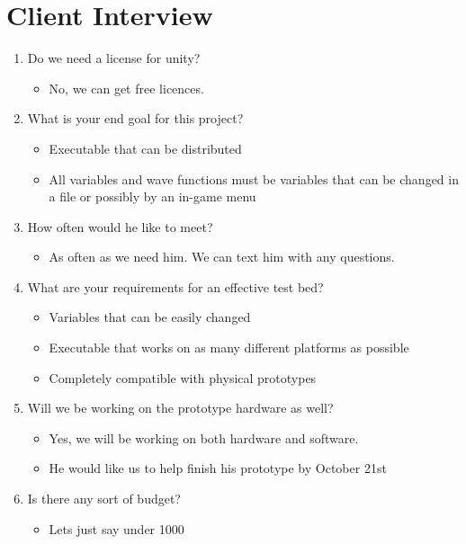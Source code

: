 \documentclass{scrreprt}
\begin{document}
\section{Client Interview}
\begin{enumerate}
\item Do we need a license for unity?
\begin{itemize}
  \item No, we can get free licences.
\end{itemize}
   
\item What is your end goal for this project?
\begin{itemize}
  \item Executable that can be distributed
  \item All variables and wave functions must be variables that can be changed in a file or possibly by an in-game menu
\end{itemize}

\item How often would he like to meet?
\begin{itemize}
  \item As often as we need him. We can text him with any questions.
\end{itemize}
  
\item What are your requirements for an effective test bed?
\begin{itemize}
  \item Variables that can be easily changed
  \item Executable that works on as many different platforms as possible
  \item Completely compatible with physical prototypes
\end{itemize}

\item Will we be working on the prototype hardware as well?
\begin{itemize}
\item Yes, we will be working on both hardware and software.
\item He would like us to help finish his prototype by October 21st
\end{itemize}

\item Is there any sort of budget?
\begin{itemize}
\item Lets just say under 1000 
\end{itemize}


\end{enumerate}
\end{document}
